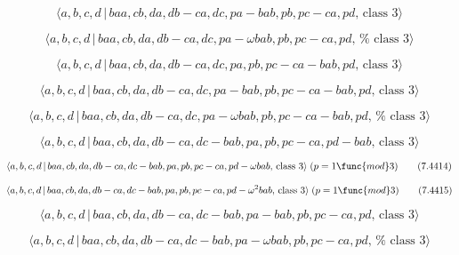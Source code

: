\documentclass[10pt]{article}
\begin{document}
\begin{equation}
\langle a,b,c,d\,|\,baa,cb,da,db-ca,dc,pa-bab,pb,pc-ca,pd,\,\text{class }%
3\rangle  \tag{7.4408}
\end{equation}

\begin{equation}
\langle a,b,c,d\,|\,baa,cb,da,db-ca,dc,pa-\omega bab,pb,pc-ca,pd,\,\text{%
class }3\rangle  \tag{7.4409}
\end{equation}

\begin{equation}
\langle a,b,c,d\,|\,baa,cb,da,db-ca,dc,pa,pb,pc-ca-bab,pd,\,\text{class }%
3\rangle  \tag{7.4410}
\end{equation}

\begin{equation}
\langle a,b,c,d\,|\,baa,cb,da,db-ca,dc,pa-bab,pb,pc-ca-bab,pd,\,\text{class }%
3\rangle  \tag{7.4411}
\end{equation}

\begin{equation}
\langle a,b,c,d\,|\,baa,cb,da,db-ca,dc,pa-\omega bab,pb,pc-ca-bab,pd,\,\text{%
class }3\rangle  \tag{7.4412}
\end{equation}

\begin{equation}
\langle a,b,c,d\,|\,baa,cb,da,db-ca,dc-bab,pa,pb,pc-ca,pd-bab,\,\text{class }%
3\rangle  \tag{7.4413}
\end{equation}

\begin{equation}
\langle a,b,c,d\,|\,baa,cb,da,db-ca,dc-bab,pa,pb,pc-ca,pd-\omega bab,\,\text{%
class }3\rangle \;(p=1\func{mod}3)  \tag{7.4414}
\end{equation}

\begin{equation}
\langle a,b,c,d\,|\,baa,cb,da,db-ca,dc-bab,pa,pb,pc-ca,pd-\omega ^{2}bab,\,%
\text{class }3\rangle \;(p=1\func{mod}3)  \tag{7.4415}
\end{equation}

\begin{equation}
\langle a,b,c,d\,|\,baa,cb,da,db-ca,dc-bab,pa-bab,pb,pc-ca,pd,\,\text{class }%
3\rangle  \tag{7.4416}
\end{equation}

\begin{equation}
\langle a,b,c,d\,|\,baa,cb,da,db-ca,dc-bab,pa-\omega bab,pb,pc-ca,pd,\,\text{%
class }3\rangle  \tag{7.4417}
\end{equation}
\end{document}

